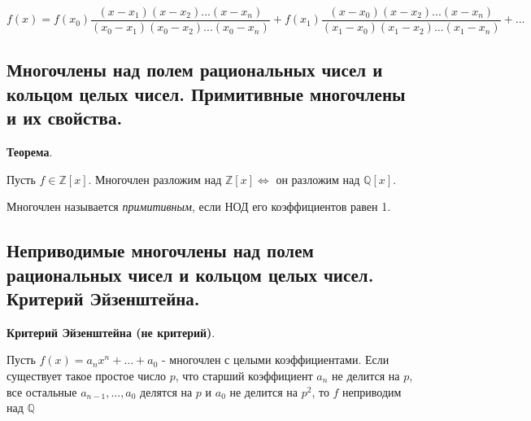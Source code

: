 \documentclass[a4paper]{article}
\begin{document}
\[
f(x) = f(x_0) \frac{(x-x_1)(x-x_2)...(x-x_n)}{(x_0-x_1)(x_0-x_2)...(x_0-x_n)} + f(x_1) \frac{(x-x_0)(x-x_2)...(x-x_n)}{(x_1-x_0)(x_1-x_2)...(x_1-x_n)} + ...
\]

\subsection*{Многочлены над полем рациональных чисел и кольцом целых чисел. Примитивные многочлены и их свойства.}

\begin{htheorem}\textbf{Теорема}.

Пусть $f \in \mathbb{Z}[x]$. Многочлен разложим над $\mathbb{Z}[x] \Leftrightarrow$ он разложим над $\mathbb{Q}[x]$.
\end{htheorem}


Многочлен называется \textit{примитивным}, если НОД его коэффициентов равен 1.

\subsection*{Неприводимые многочлены над полем рациональных чисел и кольцом целых чисел. Критерий Эйзенштейна.}

\begin{htheorem}\textbf{Критерий Эйзенштейна (не критерий)}.

Пусть $f(x) = a_nx^n + ... + a_0$ - многочлен с целыми коэффициентами. Если существует такое простое число $p$, что старший коэффициент $a_n$ не делится на $p$, все остальные $a_{n-1}, ... , a_0$ делятся на $p$ и $a_0$ не делится на $p^2$, то $f$ неприводим над $\mathbb{Q}$
\end{htheorem}
\end{document}
